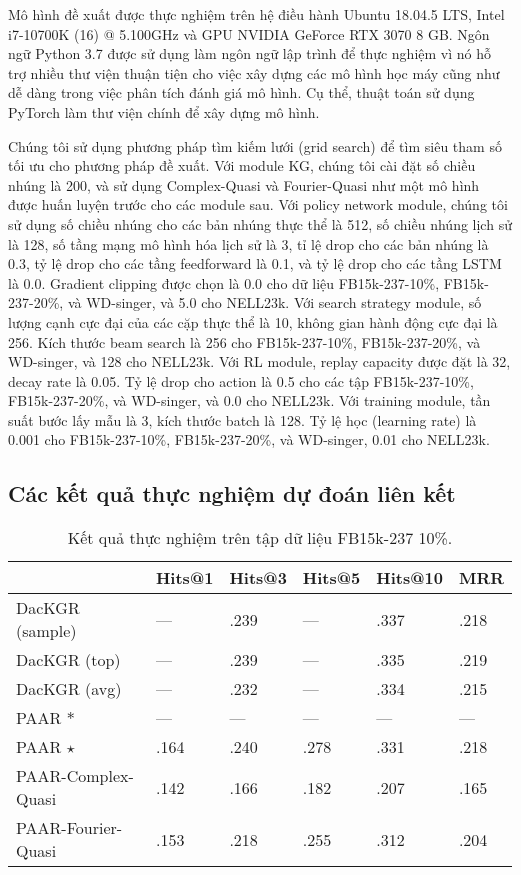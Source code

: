Mô hình đề xuất  được thực nghiệm trên hệ điều hành Ubuntu 18.04.5 LTS, Intel i7-10700K (16) @ 5.100GHz và GPU NVIDIA GeForce RTX 3070 8 GB. Ngôn ngữ Python 3.7 được sử dụng làm ngôn ngữ lập trình để thực nghiệm vì nó hỗ trợ nhiều thư viện thuận tiện cho việc xây dựng các mô hình học máy cũng như dễ dàng trong việc phân tích đánh giá mô hình. Cụ thể, thuật toán sử dụng PyTorch làm thư viện chính để xây dựng mô hình.

Chúng tôi sử dụng phương pháp tìm kiếm lưới (grid search) để tìm siêu tham số tối ưu cho phương pháp đề xuất. Với module KG, chúng tôi cài đặt số chiều nhúng là 200, và sử dụng Complex-Quasi và Fourier-Quasi như một mô hình được huấn luyện trước cho các module sau. Với policy network module, chúng tôi sử dụng số chiều nhúng cho các bản nhúng thực thể là 512, số chiều nhúng lịch sử là 128, số tầng mạng mô hình hóa lịch sử là 3, tỉ lệ drop cho các bản nhúng là 0.3, tỷ lệ drop cho các tầng feedforward là 0.1, và tỷ lệ drop cho các tầng LSTM là 0.0. Gradient clipping được chọn là 0.0 cho dữ liệu FB15k-237-10\%, FB15k-237-20\%, và WD-singer, và 5.0 cho NELL23k. Với search strategy module, số lượng cạnh cực đại của các cặp thực thể là 10, không gian hành động cực đại là 256. Kích thước beam search là 256 cho FB15k-237-10\%, FB15k-237-20\%, và  WD-singer, và 128 cho NELL23k. Với RL module, replay capacity được đặt là 32, decay rate là 0.05. Tỷ lệ drop cho action là 0.5 cho các tập FB15k-237-10\%, FB15k-237-20\%, và  WD-singer, và 0.0 cho NELL23k. Với training module, tần suất bước lấy mẫu là 3, kích thước batch là 128. Tỷ lệ học (learning rate) là 0.001 cho FB15k-237-10\%, FB15k-237-20\%, và  WD-singer, 0.01 cho NELL23k.

\subsection{Các kết quả thực nghiệm dự đoán liên kết}

\begin{center}
    \begin{table}[H]
        \centering
        \caption{Kết quả thực nghiệm trên tập dữ liệu FB15k-237 10\%.}
        \begin{tabular}{llllll}
            \toprule
         & Hits@1 & Hits@3 & Hits@5 & Hits@10 & MRR \\
            \midrule
         DacKGR (sample) & --- &  .239 & --- &  .337&  .218\\
         DacKGR (top) & --- &  .239 & --- & .335 & .219 \\
         DacKGR (avg) & --- & .232 & --- & .334 & .215 \\
         PAAR $\ast$& --- & --- & --- &  ---&  ---\\
         PAAR $\star$&  .164&  .240&  .278&  .331&  .218\\
         PAAR-Complex-Quasi &  .142 &  .166&  .182&  .207&  .165\\
         PAAR-Fourier-Quasi & .153 & .218 & .255 & .312 &.204  \\
         \bottomrule
        \end{tabular}
    \end{table}
\end{center}


